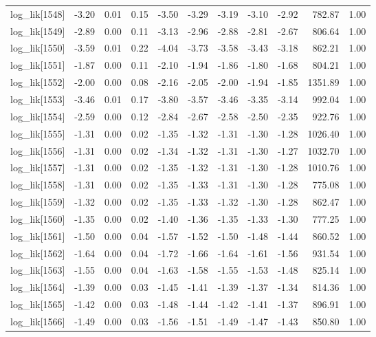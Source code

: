 \begin{table}[ht]
\begin{tabular}{rrrrrrrrrrr}
  log\_lik[1548] & -3.20 & 0.01 & 0.15 & -3.50 & -3.29 & -3.19 & -3.10 & -2.92 & 782.87 & 1.00 \\ 
  log\_lik[1549] & -2.89 & 0.00 & 0.11 & -3.13 & -2.96 & -2.88 & -2.81 & -2.67 & 806.64 & 1.00 \\ 
  log\_lik[1550] & -3.59 & 0.01 & 0.22 & -4.04 & -3.73 & -3.58 & -3.43 & -3.18 & 862.21 & 1.00 \\ 
  log\_lik[1551] & -1.87 & 0.00 & 0.11 & -2.10 & -1.94 & -1.86 & -1.80 & -1.68 & 804.21 & 1.00 \\ 
  log\_lik[1552] & -2.00 & 0.00 & 0.08 & -2.16 & -2.05 & -2.00 & -1.94 & -1.85 & 1351.89 & 1.00 \\ 
  log\_lik[1553] & -3.46 & 0.01 & 0.17 & -3.80 & -3.57 & -3.46 & -3.35 & -3.14 & 992.04 & 1.00 \\ 
  log\_lik[1554] & -2.59 & 0.00 & 0.12 & -2.84 & -2.67 & -2.58 & -2.50 & -2.35 & 922.76 & 1.00 \\ 
  log\_lik[1555] & -1.31 & 0.00 & 0.02 & -1.35 & -1.32 & -1.31 & -1.30 & -1.28 & 1026.40 & 1.00 \\ 
  log\_lik[1556] & -1.31 & 0.00 & 0.02 & -1.34 & -1.32 & -1.31 & -1.30 & -1.27 & 1032.70 & 1.00 \\ 
  log\_lik[1557] & -1.31 & 0.00 & 0.02 & -1.35 & -1.32 & -1.31 & -1.30 & -1.28 & 1010.76 & 1.00 \\ 
  log\_lik[1558] & -1.31 & 0.00 & 0.02 & -1.35 & -1.33 & -1.31 & -1.30 & -1.28 & 775.08 & 1.00 \\ 
  log\_lik[1559] & -1.32 & 0.00 & 0.02 & -1.35 & -1.33 & -1.32 & -1.30 & -1.28 & 862.47 & 1.00 \\ 
  log\_lik[1560] & -1.35 & 0.00 & 0.02 & -1.40 & -1.36 & -1.35 & -1.33 & -1.30 & 777.25 & 1.00 \\ 
  log\_lik[1561] & -1.50 & 0.00 & 0.04 & -1.57 & -1.52 & -1.50 & -1.48 & -1.44 & 860.52 & 1.00 \\ 
  log\_lik[1562] & -1.64 & 0.00 & 0.04 & -1.72 & -1.66 & -1.64 & -1.61 & -1.56 & 931.54 & 1.00 \\ 
  log\_lik[1563] & -1.55 & 0.00 & 0.04 & -1.63 & -1.58 & -1.55 & -1.53 & -1.48 & 825.14 & 1.00 \\ 
  log\_lik[1564] & -1.39 & 0.00 & 0.03 & -1.45 & -1.41 & -1.39 & -1.37 & -1.34 & 814.36 & 1.00 \\ 
  log\_lik[1565] & -1.42 & 0.00 & 0.03 & -1.48 & -1.44 & -1.42 & -1.41 & -1.37 & 896.91 & 1.00 \\ 
  log\_lik[1566] & -1.49 & 0.00 & 0.03 & -1.56 & -1.51 & -1.49 & -1.47 & -1.43 & 850.80 & 1.00 \\ 

\end{tabular}
\end{table}
